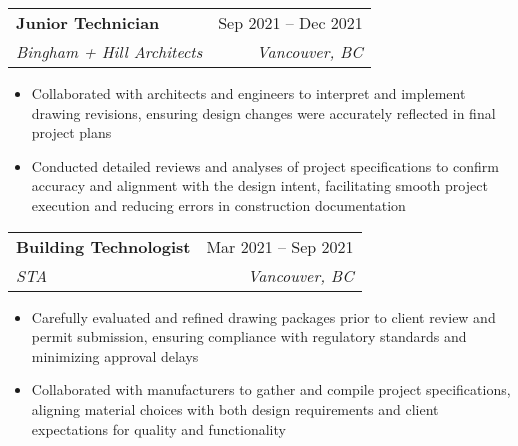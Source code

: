 \documentclass[letterpaper,11pt]{article}
\makeatletter
\newcommand{\resumeItem}[1]{
  \item\small{
    {#1 \vspace{-2pt}}
  }
}
\newcommand{\resumeSubheading}[4]{
  \vspace{-2pt}\item
    \begin{tabular*}{0.97\textwidth}[t]{l@{\extracolsep{\fill}}r}
      \textbf{#1} & #2 \\
      \textit{\small#3} & \textit{\small #4} \\
    \end{tabular*}\vspace{-7pt}
}
\newcommand{\resumeSubSubheading}[2]{
    \item
    \begin{tabular*}{0.97\textwidth}{l@{\extracolsep{\fill}}r}
      \textit{\small#1} & \textit{\small #2} \\
    \end{tabular*}\vspace{-7pt}
}
\newcommand{\resumeSubHeadingListEnd}{\end{itemize}}
\newcommand{\resumeItemListStart}{\begin{itemize}}
\newcommand{\resumeItemListEnd}{\end{itemize}\vspace{-5pt}}
\makeatother
\begin{document}
\resumeSubheading
{Junior Technician}{Sep 2021 -- Dec 2021}
{Bingham + Hill Architects}{Vancouver, BC}
\resumeItemListStart
\resumeItem{Collaborated with architects and engineers to interpret and implement drawing revisions, ensuring design changes were accurately reflected in final project plans}
\resumeItem{Conducted detailed reviews and analyses of project specifications to confirm accuracy and alignment with the design intent, facilitating smooth project execution and reducing errors in construction documentation}
\resumeItemListEnd

\resumeSubheading
{Building Technologist}{Mar 2021 -- Sep 2021}
{STA}{Vancouver, BC}
\resumeItemListStart
\resumeItem{Carefully evaluated and refined drawing packages prior to client review and permit submission, ensuring compliance with regulatory standards and minimizing approval delays}
\resumeItem{Collaborated with manufacturers to gather and compile project specifications, aligning material choices with both design requirements and client expectations for quality and functionality}
\resumeItemListEnd




\end{document}
